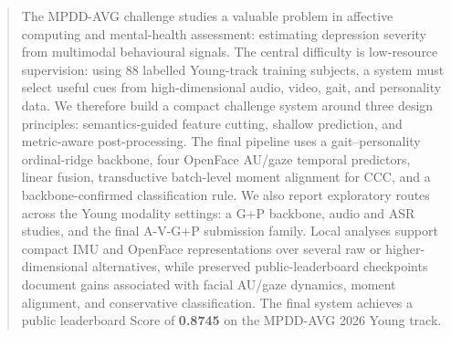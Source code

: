 \documentclass[sigconf,screen,review]{acmart}
\begin{document}
\author{Jingyao Xue}

\author{Yiming Gao}

\author{Yingming Gao}

\author{Ya Li}
\authornotemark[1]



\renewcommand{\shortauthors}{Gong et al.}
\begin{abstract}
The MPDD-AVG challenge studies a valuable problem in affective computing and
mental-health assessment: estimating depression severity from multimodal
behavioural signals. The central difficulty is low-resource supervision: using
88 labelled Young-track training subjects, a system must select useful cues from
high-dimensional audio, video, gait, and personality data. We therefore build a
compact challenge system around three design principles: semantics-guided
feature cutting, shallow prediction, and metric-aware post-processing. The final
pipeline uses a gait--personality ordinal-ridge backbone, four OpenFace AU/gaze
temporal predictors, linear fusion, transductive batch-level moment alignment
for CCC, and a backbone-confirmed classification rule. We also report
exploratory routes across the Young modality settings: a G+P backbone, audio
and ASR studies, and the final A-V-G+P submission family. Local analyses
support compact IMU and OpenFace representations over several raw or
higher-dimensional alternatives, while preserved public-leaderboard checkpoints
document gains associated with facial AU/gaze dynamics, moment alignment, and
conservative classification. The final system achieves a public leaderboard
Score of \textbf{0.8745} on the MPDD-AVG 2026 Young track.
\end{abstract}
\end{document}
